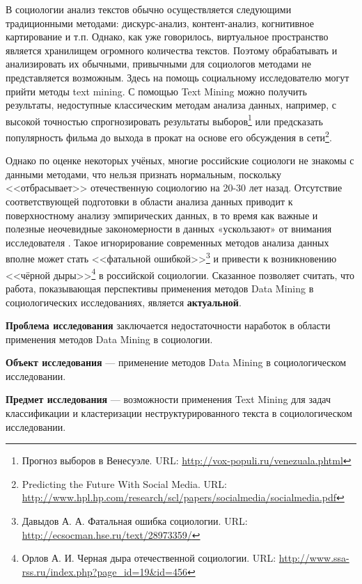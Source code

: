 В социологии анализ текстов обычно осуществляется следующими традиционными методами: дискурс-анализ,  контент-анализ, когнитивное картирование и т.п. Однако, как уже говорилось, виртуальное пространство является хранилищем огромного количества текстов. Поэтому обрабатывать и анализировать их обычными, привычными для социологов методами не  представляется возможным. Здесь на помощь социальному исследователю могут прийти методы text mining. С помощью Text Mining можно получить результаты, недоступные классическим методам анализа данных, например, с высокой точностью спрогнозировать результаты выборов\footnote{Прогноз выборов в Венесуэле. URL: \url{http://vox-populi.ru/venezuala.phtml}} или предсказать популярность фильма до выхода в прокат на основе его обсуждения в сети\footnote{Predicting the Future With Social Media. URL: \url{http://www.hpl.hp.com/research/scl/papers/socialmedia/socialmedia.pdf}}. 

Однако по оценке некоторых учёных, многие российские социологи не знакомы с данными методами, что нельзя признать нормальным, поскольку <<отбрасывает>> отечественную социологию на 20-30 лет назад. Отсутствие соответствующей подготовки в области анализа данных приводит к поверхностному анализу эмпирических данных, в то время как важные и полезные неочевидные закономерности в данных «ускользают» от внимания исследователя \cite{Davydov_Knowledge}. Такое игнорирование современных методов анализа данных вполне может стать <<фатальной ошибкой>>\footnote{Давыдов А. А. Фатальная ошибка социологии. URL: \url{http://ecsocman.hse.ru/text/28973359/}}  и привести к возникновению <<чёрной дыры>>\footnote{Орлов А. И. Черная дыра отечественной социологии. URL: \url{http://www.ssa-rss.ru/index.php?page_id=19&id=456}} в российской социологии. Сказанное позволяет считать, что работа, показывающая перспективы применения методов Data Mining в социологических исследованиях, является \textbf{актуальной}.

\textbf{Проблема исследования} заключается недостаточности наработок в области применения методов Data Mining в социологии.

\textbf{Объект исследования} --- применение методов Data Mining в социологическом исследовании.

\textbf{Предмет исследования} --- возможности применения Text Mining для задач классификации и кластеризации неструктурированного текста в социологическом исследовании.
\clearpage